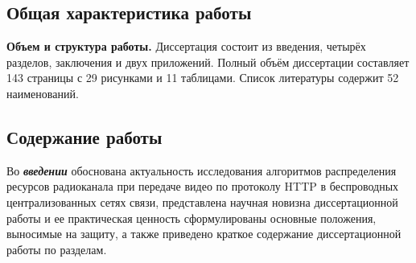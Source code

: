 \subsection*{Общая характеристика работы}

\newcommand{\actuality}{{\textbf{Актуальность темы.}}}
\newcommand{\aim}{{\textbf{Целью}}}
\newcommand{\tasks}{{\textbf{задачи}}}
\newcommand{\defpositions}{{\textbf{Основные положения, выносимые на~защиту:}}}
\newcommand{\novelty}{{\textbf{Научная новизна:}}}
\newcommand{\influence}{{\textbf{Практическая значимость}}}
\newcommand{\reliability}{{\textbf{Достоверность}}}
\newcommand{\probation}{{\textbf{Апробация работы.}}}
\newcommand{\contribution}{{\textbf{Личный вклад.}}}
\newcommand{\publications}{{\textbf{Публикации.}}}

\newtheorem{theorem}{Теорема}
\newtheorem{definition}[theorem]{Определение}
\newtheorem{assumption}[theorem]{Допущение}
\newtheorem{assumptionext}[theorem]{Допущение}
\newtheorem{lemma}[theorem]{Утверждение}




{\textbf{Объем и структура работы.}} Диссертация состоит из введения, четырёх разделов, заключения и двух приложений. Полный объём диссертации составляет 143 страницы с 29 рисунками и 11 таблицами. Список литературы содержит 52 наименований.

\subsection*{Содержание работы}
Во \textbf{\textit{введении}} обоснована актуальность исследования алгоритмов распределения ресурсов радиоканала при передаче видео по протоколу HTTP в беспроводных централизованных сетях связи, представлена научная новизна диссертационной работы и ее практическая ценность сформулированы основные положения, выносимые на защиту, а также приведено краткое содержание диссертационной работы по разделам.


